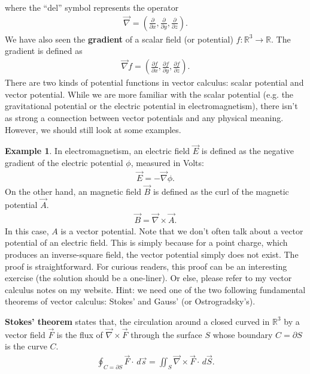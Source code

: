 \documentclass{article}
\theoremstyle{definition}
\newtheorem{exmp}{Example}[section]
\begin{document}
where the ``del'' symbol represents the operator
\begin{align*}
\vec{\nabla} = \left( \frac{\partial }{\partial x} , \frac{\partial }{\partial y} , \frac{\partial }{\partial z} \right). 
\end{align*}
We have also seen the \textbf{gradient} of a scalar field (or potential) $f : \mathbb{R}^3 \rightarrow \mathbb{R}$. The gradient is defined as
\begin{align*}
\vec{\nabla}f = \left( \frac{\partial f}{\partial x} , \frac{\partial f }{\partial y} , \frac{\partial f}{\partial z}\right) .
\end{align*}
There are two kinds of potential functions in vector calculus: scalar potential and vector potential. While we are more familiar with the scalar potential (e.g. the gravitational potential or the electric potential in electromagnetism), there isn't as strong a connection between vector potentials and any physical meaning. However, we should still look at some examples. 
\begin{exmp}
In electromagnetism, an electric field $\vec{E}$ is defined as the negative gradient of the electric potential $\phi$, measured in Volts:
\begin{align*}
\vec{E} = -\vec{\nabla}\phi.
\end{align*}
On the other hand, an magnetic field $\vec{B}$ is defined as the curl of the magnetic potential $\vec{A}$.
\begin{align*}
\vec{B} = \vec{\nabla}\times\vec{A}.
\end{align*}
In this case, $A$ is a vector potential. Note that we don't often talk about a vector potential of an electric field. This is simply because for a point charge, which produces an inverse-square field, the vector potential simply does not exist. The proof is straightforward. For curious readers, this proof can be an interesting exercise (the solution should be a one-liner). Or else, please refer to my vector calculus notes on my website. Hint: we need one of the two following fundamental theorems of vector calculus: Stokes' and Gauss' (or Ostrogradsky's).
\end{exmp}
\textbf{Stokes' theorem} states that, the circulation around a closed curved in $\mathbb{R}^3$ by a vector field $\vec{F}$ is the flux of $\vec{\nabla}\times\vec{F}$ through the surface $S$ whose boundary $C = \partial S$ is the curve $C$.
\begin{align*}\boxed{
\oint_{C = \partial S} \vec{F}\cdot\,d\vec{s} = \iint_{S} \vec{\nabla}\times \vec{F} \cdot\,d\vec{S}.}
\end{align*}
\end{document}
